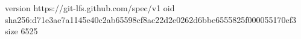 version https://git-lfs.github.com/spec/v1
oid sha256:d71e3ae7a1145e40c2ab65598cf8ac22d2e0262d6bbe6555825f000055170ef3
size 6525
